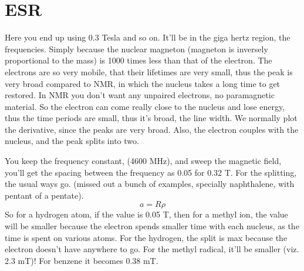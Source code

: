\section{ESR}
	Here you end up using 0.3 Tesla and so on. It'll be in the giga hertz region, the frequencies. Simply because the nuclear magneton (magneton is inversely proportional to the mass) is 1000 times less than that of the electron. The electrons are so very mobile, that their lifetimes are very small, thus the peak is very broad compared to NMR, in which the nucleus takes a long time to get restored.
	In NMR you don't want any unpaired electrons, no paramagnetic material. So the electron can come really close to the nucleus and lose energy, thus the time periods are small, thus it's broad, the line width. We normally plot the derivative, since the peaks are very broad. Also, the electron couples with the nucleus, and the peak splits into two. 
	\par
	You keep the frequency constant, (4600 MHz), and sweep the magnetic field, you'll get the spacing between the frequency as 0.05 for 0.32 T.
	For the splitting, the usual ways go. (missed out a bunch of examples, specially naphthalene, with pentant of a pentate). 
	\begin{equation}
		a = R\rho
	\end{equation}
	So for a hydrogen atom, if the value is 0.05 T, then for a methyl ion, the value will be smaller because the electron spends smaller time with each nucleus, as the time is spent on various atoms. For the hydrogen, the split is max because the electron doesn't have anywhere to go. For the methyl radical, it'll be smaller (viz. 2.3 mT)! For benzene it becomes 0.38 mT.